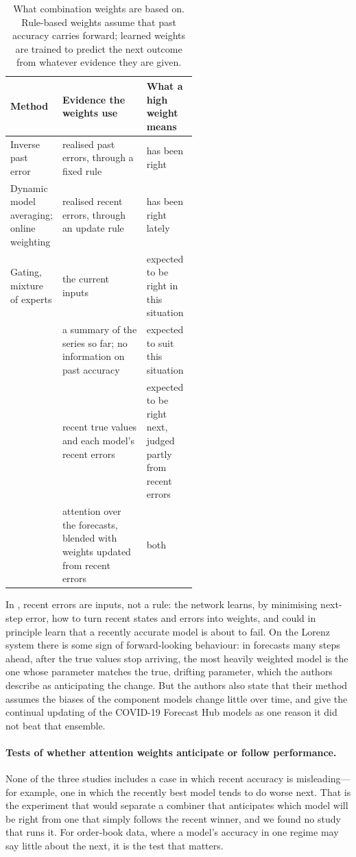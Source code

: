 \begin{table}[!htbp]
\centering\footnotesize
\caption{What combination weights are based on. Rule-based weights assume that past accuracy carries forward;
learned weights are trained to predict the next outcome from whatever evidence they are given.}
\label{tab:lookback}
\begin{tabularx}{\linewidth}{>{\raggedright\arraybackslash}p{0.27\linewidth}>{\raggedright\arraybackslash}X>{\raggedright\arraybackslash}p{0.27\linewidth}}
\toprule
Method & Evidence the weights use & What a high weight means \\
\midrule
Inverse past error~\citep{bates1969} & realised past errors, through a fixed rule & has been right \\
Dynamic model averaging; online weighting & realised recent errors, through an update rule & has been right lately \\
Gating, mixture of experts & the current inputs & expected to be right in this situation \\
\citet{bourgin2021maes} & a summary of the series so far; no information on past accuracy & expected to suit this situation \\
\citet{patel2023attnpool} & recent true values and each model's recent errors & expected to be right next, judged partly from recent errors \\
\citet{chen2025e3former} & attention over the forecasts, blended with weights updated from recent errors & both \\
\bottomrule
\end{tabularx}
\end{table}

In \citet{patel2023attnpool}, recent errors are inputs, not a rule: the network learns, by minimising next-step
error, how to turn recent states and errors into weights, and could in principle learn that a recently accurate
model is about to fail. On the Lorenz system there is some sign of forward-looking behaviour: in forecasts many
steps ahead, after the true values stop arriving, the most heavily weighted model is the one whose parameter
matches the true, drifting parameter, which the authors describe as anticipating the change. But the authors also
state that their method assumes the biases of the component models change little over time, and give the
continual updating of the COVID-19 Forecast Hub models as one reason it did not beat that ensemble. 

\paragraph{Tests of whether attention weights anticipate or follow performance.} None of the three studies
includes a case in which recent accuracy is misleading---for example, one in which the recently best model tends
to do worse next. That is the experiment that would separate a combiner that anticipates which model will be
right from one that simply follows the recent winner, and we found no study that runs it. For order-book data, where a
model's accuracy in one regime may say little about the next, it is the test that matters.


